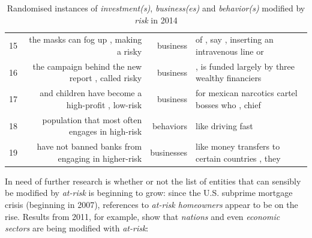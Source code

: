 \begin{table}
\begin{tabular}{lrrl}
15 &               the masks can fog up , making a risky  &     business &          of , say , inserting an intravenous line or \\
16 &   the campaign behind the new report , called risky  &     business &      , is funded largely by three wealthy financiers \\
17 &   and children have become a high-profit , low-risk  &     business &      for mexican narcotics cartel bosses who , chief \\
18 &     population that most often engages in high-risk  &    behaviors &                                    like driving fast \\
19 &  have not banned banks from engaging in higher-risk  &   businesses &     like money transfers to certain countries , they \\
\bottomrule
\end{tabular}
\caption[\emph{investment(s)}, \emph{business(es)} and \emph{behavior(s)} modified by \emph{risk} in 2014]{Randomised instances of \emph{investment(s)}, \emph{business(es)} and \emph{behavior(s)} modified by \emph{risk} in 2014}
\label{conc:investbusinessbehavior}
\end{table}

    In need of further research is whether or not the list of entities that can sensibly be modified by \emph{at-risk} is beginning to grow: since the U.S. subprime mortgage crisis (beginning in 2007), references to \emph{at-risk homeowners} appear to be on the rise. Results from 2011, for example, show that \emph{nations} and even \emph{economic sectors} are being modified with \emph{at-risk}:

